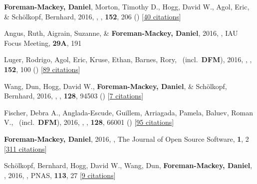 \item[{\color{numcolor}\scriptsize22}] \textbf{Foreman-Mackey, Daniel}, Morton, Timothy D., Hogg, David W., Agol, Eric, \& Sch{\"o}lkopf, Bernhard, 2016, , \aj, \textbf{152}, 206 () [\href{http://adsabs.harvard.edu/abs/2016AJ....152..206F}{40 citations}]

\item[{\color{numcolor}\scriptsize21}] Angus, Ruth, Aigrain, Suzanne, \& \textbf{Foreman-Mackey, Daniel}, 2016, , IAU Focus Meeting, \textbf{29A}, 191

\item[{\color{numcolor}\scriptsize20}] Luger, Rodrigo, Agol, Eric, Kruse, Ethan, Barnes, Rory, \etal\ (incl.\ \textbf{DFM}), 2016, , \aj, \textbf{152}, 100 () [\href{http://adsabs.harvard.edu/abs/2016AJ....152..100L}{89 citations}]

\item[{\color{numcolor}\scriptsize19}] Wang, Dun, Hogg, David W., \textbf{Foreman-Mackey, Daniel}, \& Sch{\"o}lkopf, Bernhard, 2016, , \pasp, \textbf{128}, 94503 () [\href{http://adsabs.harvard.edu/abs/2016PASP..128i4503W}{7 citations}]

\item[{\color{numcolor}\scriptsize18}] Fischer, Debra A., Anglada-Escude, Guillem, Arriagada, Pamela, Baluev, Roman V., \etal\ (incl.\ \textbf{DFM}), 2016, , \pasp, \textbf{128}, 66001 () [\href{http://adsabs.harvard.edu/abs/2016PASP..128f6001F}{95 citations}]

\item[{\color{numcolor}\scriptsize17}] \textbf{Foreman-Mackey, Daniel}, 2016, , The Journal of Open Source Software, \textbf{1}, 2 [\href{https://scholar.google.com/scholar?cites=1835087844145558435,9294978791003210998,17836006976722650130,12820425635803494730}{311 citations}]

\item[{\color{numcolor}\scriptsize16}] Sch{\"o}lkopf, Bernhard, Hogg, David W., Wang, Dun, \textbf{Foreman-Mackey, Daniel}, \etal, 2016, , PNAS, \textbf{113}, 27 [\href{https://scholar.google.com/scholar?cites=2429561747341807338}{9 citations}]

